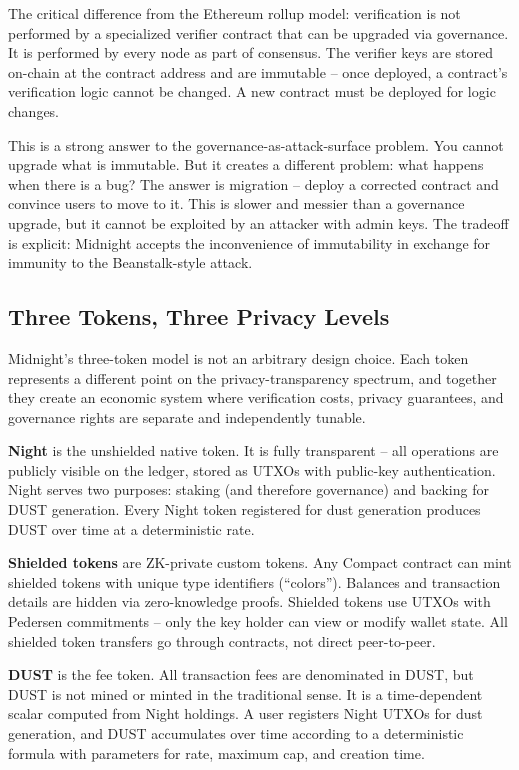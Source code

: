 \documentclass[
  11pt,
  openany]{report}
\renewcommand{\textbf}[1]{{\bfseries\color{MidnightBold}#1}}
\begin{document}
The critical difference from the Ethereum rollup model: verification is not
performed by a specialized verifier contract that can be upgraded via
governance. It is performed by every node as part of consensus. The verifier
keys are stored on-chain at the contract address and are immutable -- once
deployed, a contract's verification logic cannot be changed. A new contract must
be deployed for logic changes.

This is a strong answer to the governance-as-attack-surface problem. You cannot
upgrade what is immutable. But it creates a different problem: what happens when
there is a bug? The answer is migration -- deploy a corrected contract and
convince users to move to it. This is slower and messier than a governance
upgrade, but it cannot be exploited by an attacker with admin keys. The tradeoff
is explicit: Midnight accepts the inconvenience of immutability in exchange for
immunity to the Beanstalk-style attack.

\subsection{Three Tokens, Three Privacy
Levels}\label{three-tokens-three-privacy-levels}

Midnight's three-token model is not an arbitrary design choice. Each token
represents a different point on the privacy-transparency spectrum, and together
they create an economic system where verification costs, privacy guarantees, and
governance rights are separate and independently tunable.

\textbf{Night} is the unshielded native token. It is fully transparent -- all
operations are publicly visible on the ledger, stored as UTXOs with public-key
authentication. Night serves two purposes: staking (and therefore governance)
and backing for DUST generation. Every Night token registered for dust
generation produces DUST over time at a deterministic rate.

\textbf{Shielded tokens} are ZK-private custom tokens. Any Compact contract can
mint shielded tokens with unique type identifiers (``colors''). Balances and
transaction details are hidden via zero-knowledge proofs. Shielded tokens use
UTXOs with Pedersen commitments -- only the key holder can view or modify wallet
state. All shielded token transfers go through contracts, not direct
peer-to-peer.

\textbf{DUST} is the fee token. All transaction fees are denominated in DUST,
but DUST is not mined or minted in the traditional sense. It is a time-dependent
scalar computed from Night holdings. A user registers Night UTXOs for dust
generation, and DUST accumulates over time according to a deterministic formula
with parameters for rate, maximum cap, and creation time.
\end{document}
